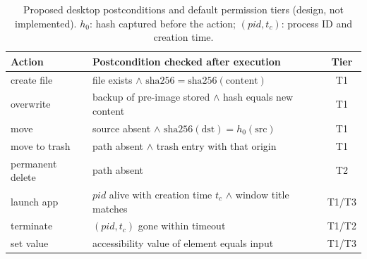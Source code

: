 \begin{table}[t]
\centering
\caption{Proposed desktop postconditions and default permission tiers (design, not implemented). $h_0$: hash captured before the action; $(\mathit{pid}, t_c)$: process ID and creation time.}
\label{tab:desktop}
\footnotesize
\setlength{\tabcolsep}{2.5pt}
\begin{tabular}{@{}p{1.75cm}p{4.35cm}c@{}}
\toprule
Action & Postcondition checked after execution & Tier \\
\midrule
create file & file exists $\wedge$ $\mathrm{sha256}=\mathrm{sha256}(\text{content})$ & T1 \\
overwrite & backup of pre-image stored $\wedge$ hash equals new content & T1 \\
move & source absent $\wedge$ $\mathrm{sha256}(\text{dst}) = h_0(\text{src})$ & T1 \\
move to trash & path absent $\wedge$ trash entry with that origin & T1 \\
permanent delete & path absent & T2 \\
launch app & $\mathit{pid}$ alive with creation time $t_c$ $\wedge$ window title matches & T1/T3 \\
terminate & $(\mathit{pid}, t_c)$ gone within timeout & T1/T2 \\
set value & accessibility value of element equals input & T1/T3 \\
\bottomrule
\end{tabular}
\end{table}
